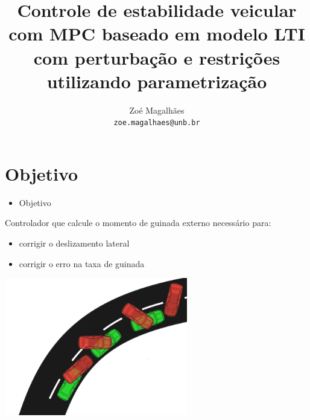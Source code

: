 \documentclass{beamer}
\title[]{Controle de estabilidade veicular com MPC baseado em modelo LTI com
perturbação e restrições utilizando parametrização}%
\author{ Zoé Magalhães \\%
         \texttt{zoe.magalhaes@unb.br}}%
\institute[PPMEC]{Departamento de Engenharia Mecânica\\%
                Universidade de Brasília}%
\date[2018]{}%
\begin{document}
 

\frame{\titlepage}%

\section{Objetivo}%
  
\begin{frame}[t]%
	\begin{itemize}
		\item Objetivo 
	\end{itemize}
	Controlador que calcule o momento de guinada externo necessário para:
	\begin{itemize}
	  \item corrigir o deslizamento lateral
	  \item corrigir o erro na taxa de guinada
	\end{itemize}
	  \includegraphics[width=0.6\textwidth]{oversteer.png}%
\end{frame}
  
\end{document}
